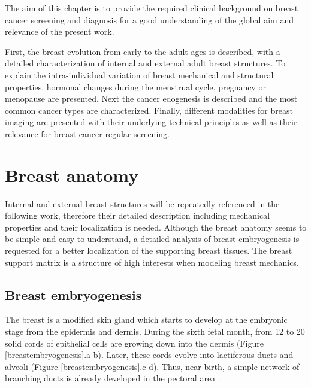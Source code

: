 

The aim of this chapter is to provide the required clinical background on breast cancer screening and diagnosis for a good understanding of the global aim and relevance of the present work. 

First, the breast evolution from early to the adult ages is described, with a detailed characterization of internal and external adult breast structures. To explain the intra-individual variation of breast mechanical and structural properties, hormonal changes during the menstrual cycle, pregnancy or menopause are presented.   Next the cancer edogenesis is described and the most common cancer types are characterized. Finally, different modalities for breast imaging are presented with their underlying technical principles as well as their relevance for breast cancer regular screening.

\clearpage
\section{Breast anatomy}\label{section:breastanatomy}

Internal and external breast structures will be repeatedly referenced in the following work, therefore their detailed description including mechanical properties and their localization is needed. Although the breast anatomy seems to be simple and easy to understand, a detailed analysis of breast embryogenesis is requested for a better localization of the supporting breast tissues. The breast support matrix is a structure of high interests when modeling breast mechanics.  

  
\subsection{Breast embryogenesis}\label{subsection:breastembryogenesis}

The breast is a modified skin gland which starts to develop at the embryonic stage from the epidermis and dermis.  During the sixth fetal month, from 12 to 20 solid cords of epithelial cells are growing down into the dermis (Figure \ref{breastembryogenesis}.a-b). Later, these cords evolve into lactiferous ducts and alveoli (Figure \ref{breastembryogenesis}.c-d). Thus, near birth, a simple network of branching ducts is already developed in the pectoral area \citep{skandalakis_embryology_2009}.
 

